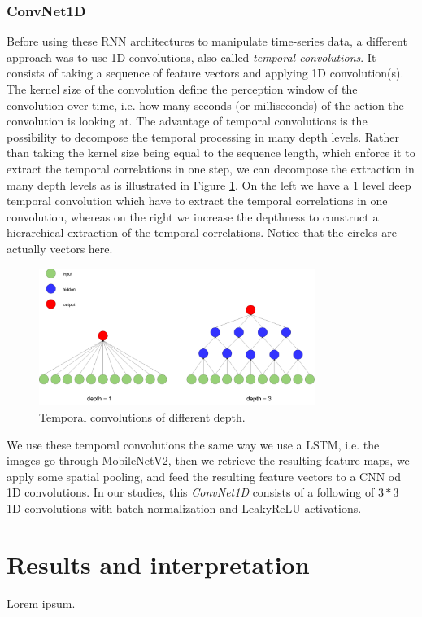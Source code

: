 \documentclass[12pt, a4paper]{report}
\begin{document}
				\subsubsection{ConvNet1D}
					Before using these RNN architectures to manipulate time-series data, a different approach was to use 1D convolutions, also called {\itshape temporal convolutions}.
					It consists of taking a sequence of feature vectors and applying 1D convolution(s).
					The kernel size of the convolution define the perception window of the convolution over time, i.e. how many seconds (or milliseconds) of the action the convolution is looking at.
					The advantage of temporal convolutions is the possibility to decompose the temporal processing in many depth levels.
					Rather than taking the kernel size being equal to the sequence length, which enforce it to extract the temporal correlations in one step, we can decompose the extraction in many depth levels as is illustrated in Figure \ref{temp_conv}.
					On the left we have a 1 level deep temporal convolution which have to extract the temporal correlations in one convolution, whereas on the right we increase the depthness to construct a hierarchical extraction of the temporal correlations.
					Notice that the circles are actually vectors here.
					\begin{figure}[h!]
						\centering
						\includegraphics[width=0.8\textwidth]{temporal_convolution.png}
						\caption{Temporal convolutions of different depth.}\label{temp_conv}
					\end{figure}
					\par
					We use these temporal convolutions the same way we use a LSTM, i.e. the images go through MobileNetV2, then we retrieve the resulting feature maps, we apply some spatial pooling, and feed the resulting feature vectors to a CNN od 1D convolutions.
					In our studies, this {\itshape ConvNet1D} consists of a following of $3*3$ 1D convolutions with batch normalization and LeakyReLU activations.
		\section{Results and interpretation}
			Lorem ipsum.
\end{document}
